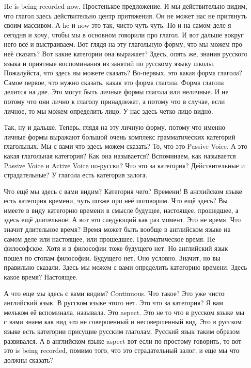\documentclass[main.tex]{subfiles}
\begin{document}

He is being recorded now.
Простенькое предложение.
И мы действительно видим, что глагол здесь действительно центр притяжения.
Он не может нас не притянуть своим массивом.
А he и now это так, чисто чуть-чуть.
Но и на самом деле я сегодня и хочу, чтобы мы в основном говорили про глагол.
И вот дальше вокруг него всё и выстраиваем.
Вот глядя на эту глагольную форму, что мы можем про неё сказать?
Вот какие категории она выражает?
Здесь, опять же, знания русского языка и приятные воспоминания из занятий по русскому языку школы.
Пожалуйста, что здесь вы можете сказать?
Во-первых, это какая форма глагола?
Самое первое, что нужно сказать, какая это форма глагола.
Форма глагола делится на две.
Это могут быть личные формы глагола или неличные.
И не потому что они лично к глаголу принадлежат, а потому что в случае, если личное, то мы можем определить лицо.
У нас здесь четко лицо видно.

Так, ну и дальше.
Теперь, глядя на эту личную форму, потому что именно личные формы выражают большой очень комплекс грамматических категорий глагольных.
Мы с вами что здесь можем сказать?
То, что это Passive Voice.
А это какая глагольная категория?
Как она называется?
Вспоминаем, как называется Passive Voice и Active Voice по-русски?
Что это за категория?
Действительные и страдательные?
У глагола есть категория залога.

Что ещё мы здесь с вами видим?
Категория чего?
Времени!
В английском языке есть категория времени, чуть позже про неё поговорим.
Что ещё здесь?
Вы имеете в виду категорию времени в смысле будущее, настоящее, прошедшее, а здесь ещё длительное.
А вот это следующий как раз момент.
Это не время.
Что значит длительное время?
Время может быть вообще в английском языке на самом деле или настоящее, или прошедшее.
Грамматическое время.
Не философское.
Хотя и в философии тоже будущего нет.
Но английский язык пошел по стопам философии.
Будущего нет.
Оно условно.
Значит, но вы правильно сказали.
Здесь мы можем с вами определить категорию времени.
Здесь какое время?
Настоящее.

А что еще мы здесь с вами видим? Continuous.
Что такое?
Это уже чисто английский язык.
В русском языке этого нет.
Это что за категория?
Я вам мельком её вспоминала, называла.
Это aspect.
Это не то что в русском языке мы с вами знаем как вид это не совершенный и несовершенный вид.
Это в русском языке есть категории присущие русским глаголам.
Русский язык таким образом развивался.
А в английском языке aspect вот если по-простому говорить, то вот это is being recorded, помимо того, что это страдательный залог, и еще мы что должны сказать?
\end{document}
